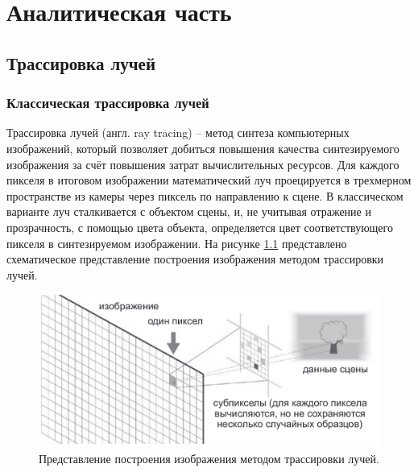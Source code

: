 \chapter{Аналитическая часть}

\section{Трассировка лучей}

\subsection{Классическая трассировка лучей}

 


Трассировка лучей (англ. ray tracing) -- метод синтеза компьютерных изображений, который позволяет добиться повышения качества синтезируемого изображения за счёт повышения затрат вычислительных ресурсов.
Для каждого пикселя в итоговом изображении математический луч проецируется в трехмерном пространстве из камеры через пиксель по направлению к сцене. В классическом варианте луч сталкивается с объектом сцены, и, не учитывая отражение и прозрачность, с помощью цвета объекта, определяется цвет соответствующего пикселя в синтезируемом изображении. На рисунке \ref{img:ray-tracing} представлено схематическое представление построения изображения методом трассировки лучей.

\begin{figure}[H]
	\begin{center}
		\includegraphics[scale=0.4]{img/ray_tracing.png}
	\end{center}
	\captionsetup{justification=centering}
	\caption{Представление построения изображения методом трассировки лучей.}
	\label{img:ray-tracing}
\end{figure}


